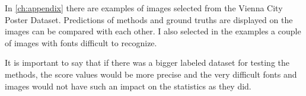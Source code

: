 In \ref*{ch:appendix} there are examples of images selected from the Vienna City Poster Dataset. Predictions of methods and ground truths are displayed on the images can be compared with each other. I also selected in the examples a couple of images with fonts difficult to recognize.

It is important to say that if there was a bigger labeled dataset for testing the methods, the score values would be more precise and the very difficult fonts and images would not have such an impact on the statistics as they did.